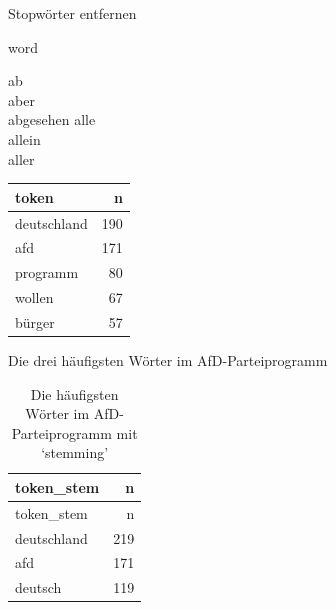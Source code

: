 \begin{frame}{Stopwörter entfernen}

\end{frame}

\begin{frame}{word}

ab\\
aber\\
abgesehen alle\\
allein\\
aller

\begin{longtable}[]{@{}lr@{}}
\toprule
token & n\tabularnewline
\midrule
\endhead
deutschland & 190\tabularnewline
afd & 171\tabularnewline
programm & 80\tabularnewline
wollen & 67\tabularnewline
bürger & 57\tabularnewline
\bottomrule
\end{longtable}

\end{frame}

\begin{frame}{Die drei häufigsten Wörter im AfD-Parteiprogramm}

\begin{longtable}[]{@{}lr@{}}
\caption{Die häufigsten Wörter im AfD-Parteiprogramm mit
`stemming'}\tabularnewline
\toprule
token\_stem & n\tabularnewline
\midrule
\endfirsthead
\toprule
token\_stem & n\tabularnewline
\midrule
\endhead
deutschland & 219\tabularnewline
afd & 171\tabularnewline
deutsch & 119\tabularnewline
\bottomrule
\end{longtable}

\end{frame}

